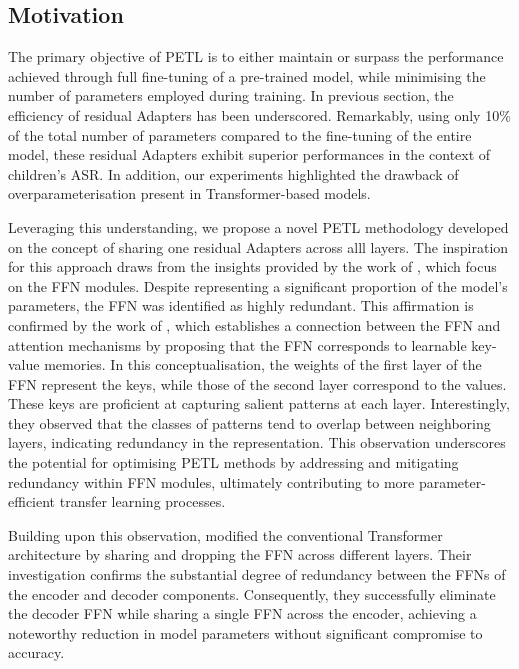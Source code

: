 \subsection{Motivation}
The primary objective of PETL is to either maintain or surpass the performance achieved through full fine-tuning of a pre-trained model, while minimising the number of parameters employed during training. In previous section, the efficiency of residual Adapters has been underscored. Remarkably, using only 10\% of the total number of parameters compared to the fine-tuning of the entire model, these residual Adapters exhibit superior performances in the context of children's ASR. In addition, our experiments highlighted the drawback of overparameterisation present in Transformer-based models.

Leveraging this understanding, we propose a novel PETL methodology developed on the concept of sharing one residual Adapters across alll layers. The inspiration for this approach draws from the insights provided by the work of \cite{pires2023one}, which focus on the FFN modules. Despite representing a significant proportion of the model's parameters, the FFN was identified as highly redundant. This affirmation is confirmed by the work of \cite{geva2020transformer}, which  establishes a connection between the FFN and attention mechanisms by proposing that the FFN corresponds to learnable key-value memories. In this conceptualisation, the weights of the first layer of the FFN represent the keys, while those of the second layer correspond to the values. These keys are proficient at capturing salient patterns at each layer. Interestingly, they observed that the classes of patterns tend to overlap between neighboring layers, indicating redundancy in the representation. This observation underscores the potential for optimising PETL methods by addressing and mitigating redundancy within FFN modules, ultimately contributing to more parameter-efficient transfer learning processes.

Building upon this observation, \cite{pires2023one} modified the conventional Transformer architecture by sharing and dropping the FFN across different layers. Their investigation confirms the substantial degree of redundancy between the FFNs of the encoder and decoder components. Consequently, they successfully eliminate the decoder FFN while sharing a single FFN across the encoder, achieving a noteworthy reduction in model parameters without significant compromise to accuracy.

